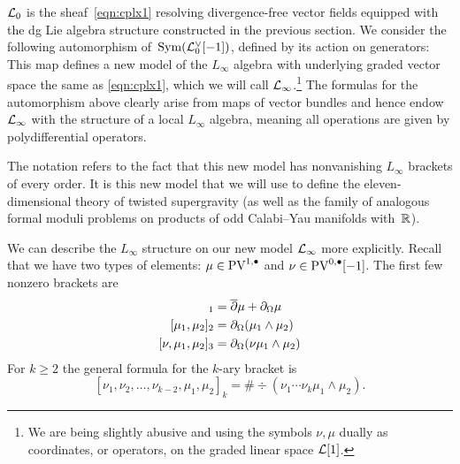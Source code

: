 $\mathcal L_0$ is the sheaf~\eqref{eqn:cplx1} resolving divergence-free vector fields equipped with the dg Lie algebra structure constructed in the previous section.
We consider the following automorphism of~$\operatorname{Sym}(\mathcal L_0^\vee[-1])$, defined by its action on generators:
This map defines a new model of the $L_\infty$ algebra with underlying graded vector space the same as \eqref{eqn:cplx1}, which we will call $\mathcal L_\infty$.\footnote{We are being slightly abusive and using the symbols $\nu,\mu$ dually as coordinates, or operators, on the graded linear space $\mathcal L[1]$.}
The formulas for the automorphism above clearly arise from maps of vector bundles and hence endow $\mathcal L_\infty$ with the structure of a local $L_\infty$ algebra, meaning all operations are given by polydifferential operators.  

The notation refers to the fact that this new model has nonvanishing $L_\infty$ brackets of every order. 
It is this new model that we will use to define the eleven-dimensional theory of twisted supergravity (as well as the family of analogous formal moduli problems on products of odd Calabi--Yau manifolds with~$\mathbb{R}$). 



We can describe the $L_\infty$ structure on our new model $\mathcal L_\infty$ more explicitly.
Recall that we have two types of elements: $\mu \in {\rm PV}^{1,\bullet}$ and $\nu \in {\rm PV}^{0,\bullet}[-1]$. 
The first few nonzero brackets are
\begin{align*}
[\mu]_1 & = \dbar \mu + \div \mu \\
[\mu_1,\mu_2]_2 & = \div (\mu_1 \wedge \mu_2) \\
[\nu, \mu_1,\mu_2]_3 & = \div(\nu \mu_1 \wedge \mu_2) 
\end{align*}
For $k \geq 2$ the general formula for the $k$-ary bracket is 
\[
[\nu_1,\nu_2, \ldots, \nu_{k-2}, \mu_1,\mu_2]_{k} = \# \div(\nu_1 \cdots \nu_k \mu_1 \wedge \mu_2) .
\]


